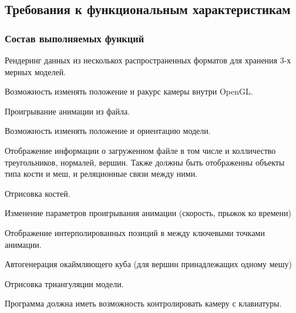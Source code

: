 

\subsection{Требования к функциональным характеристикам}
\subsubsection{Состав выполняемых функций}
\begin{my_enumerate}
\item Рендеринг данных из несколькох распространенных форматов для хранения 3-х мерных моделей.
\item Возможность изменять положение и ракурс камеры внутри OpenGL.
\item Проигрывание анимации из файла.
\item Возможность изменять положение и ориентацию модели.
\item Отображение информации о загруженном файле в том числе и колличество треугольников, нормалей, вершин. Также должны быть отображенны объекты типа кости и меш, и реляционные связи между ними. 
\item Отрисовка костей.
\item Изменение параметров проигрывания анимации (скорость, прыжок ко времени)
\item Отображение интерполированных позиций в между ключевыми точками анимации.
\item Автогенерация окаймляющего куба (для вершин принадлежащих одному мешу)
\item Отрисовка триангуляции модели.
\item Программа должна иметь возможность контролировать камеру с клавиатуры.
\end{my_enumerate}

